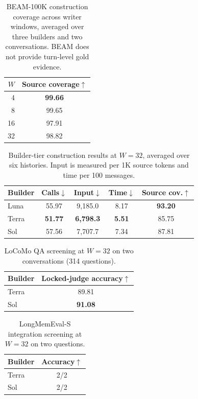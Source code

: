 \begin{table}[t]
\centering
\small
\caption{BEAM-100K construction coverage across writer windows, averaged over three builders and two conversations. BEAM does not provide turn-level gold evidence.}
\label{tab:writer-window-beam}
\begin{tabular}{rc}
\toprule
$W$ & Source coverage$\uparrow$ \\
\midrule
4  & \textbf{99.66} \\
8  & 99.65 \\
16 & 97.91 \\
32 & 98.82 \\
\bottomrule
\end{tabular}
\end{table}

\begin{table}[t]
\centering
\small
\caption{Builder-tier construction results at $W=32$, averaged over six histories. Input is measured per 1K source tokens and time per 100 messages.}
\label{tab:w32-builder-tier}
\begin{tabular}{lcccc}
\toprule
Builder & Calls$\downarrow$ & Input$\downarrow$ & Time$\downarrow$ & Source cov.$\uparrow$ \\
\midrule
Luna  & 55.97 & 9,185.0 & 8.17 & \textbf{93.20} \\
Terra & \textbf{51.77} & \textbf{6,798.3} & \textbf{5.51} & 85.75 \\
Sol   & 57.56 & 7,707.7 & 7.34 & 87.81 \\
\bottomrule
\end{tabular}
\end{table}

\begin{table}[t]
\centering
\small
\caption{LoCoMo QA screening at $W=32$ on two conversations (314 questions).}
\label{tab:w32-locomo-screening}
\begin{tabular}{lc}
\toprule
Builder & Locked-judge accuracy$\uparrow$ \\
\midrule
Terra & 89.81 \\
Sol   & \textbf{91.08} \\
\bottomrule
\end{tabular}
\end{table}

\begin{table}[t]
\centering
\small
\caption{LongMemEval-S integration screening at $W=32$ on two questions.}
\label{tab:w32-longmemeval-screening}
\begin{tabular}{lc}
\toprule
Builder & Accuracy$\uparrow$ \\
\midrule
Terra & 2/2 \\
Sol   & 2/2 \\
\bottomrule
\end{tabular}
\end{table}

